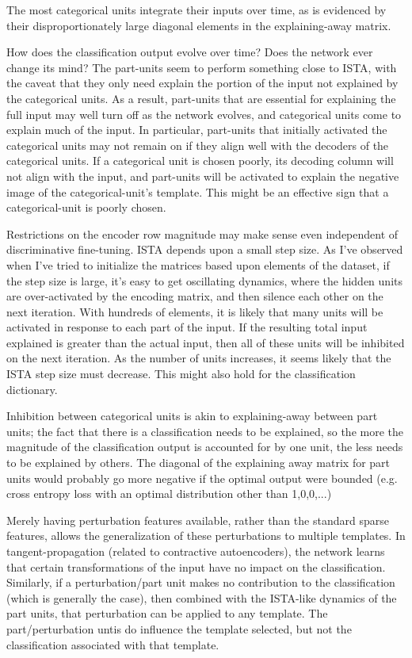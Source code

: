 The most categorical units integrate their inputs over time, as is evidenced by their disproportionately large diagonal elements in the explaining-away matrix.

How does the classification output evolve over time?  Does the network ever change its mind?  The part-units seem to perform something close to ISTA, with the caveat that they only need explain the portion of the input not explained by the categorical units.  As a result, part-units that are essential for explaining the full input may well turn off as the network evolves, and categorical units come to explain much of the input.  In particular, part-units that initially activated the categorical units may not remain on if they align well with the decoders of the categorical units.  If a categorical unit is chosen poorly, its decoding column will not align with the input, and part-units will be activated to explain the negative image of the categorical-unit's template.  This might be an effective sign that a categorical-unit is poorly chosen.  


Restrictions on the encoder row magnitude may make sense even independent of discriminative fine-tuning.  ISTA depends upon a small step size.  As I've observed when I've tried to initialize the matrices based upon elements of the dataset, if the step size is large, it's easy to get oscillating dynamics, where the hidden units are over-activated by the encoding matrix, and then silence each other on the next iteration.  With hundreds of elements, it is likely that many units will be activated in response to each part of the input.  If the resulting total input explained is greater than the actual input, then all of these units will be inhibited on the next iteration.  As the number of units increases, it seems likely that the ISTA step size must decrease.  This might also hold for the classification dictionary.


Inhibition between categorical units is akin to explaining-away between part units; the fact that there is a classification needs to be explained, so the more the magnitude of the classification output is accounted for by one unit, the less needs to be explained by others.  The diagonal of the explaining away matrix for part units would probably go more negative if the optimal output were bounded (e.g. cross entropy loss with an optimal distribution other than 1,0,0,...)


Merely having perturbation features available, rather than the standard sparse features, allows the generalization of these perturbations to multiple templates.  In tangent-propagation (related to contractive autoencoders), the network learns that certain transformations of the input have no impact on the classification.  Similarly, if a perturbation/part unit makes no contribution to the classification (which is generally the case), then combined with the ISTA-like dynamics of the part units, that perturbation can be applied to any template.  The part/perturbation untis do influence the template selected, but not the classification associated with that template.





